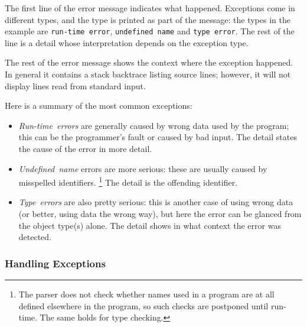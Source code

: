 The first line of the error message indicates what happened.
Exceptions come in different types, and the type is printed as part of
the message: the types in the example are
{\tt run-time error},
{\tt undefined name}
and
{\tt type error}.
The rest of the line is a detail whose interpretation depends on the
exception type.

The rest of the error message shows the context where the
exception happened.
In general it contains a stack backtrace listing source lines; however,
it will not display lines read from standard input.

Here is a summary of the most common exceptions:
\begin{itemize}
\item
{\em Run-time\ errors}
are generally caused by wrong data used by the program; this can be the
programmer's fault or caused by bad input.
The detail states the cause of the error in more detail.
\item
{\em Undefined\ name}
errors are more serious: these are usually caused by misspelled
identifiers.%
\footnote{
	The parser does not check whether names used in a program are at
	all defined elsewhere in the program, so such checks are
	postponed until run-time.  The same holds for type checking.
}
The detail is the offending identifier.
\item
{\em Type\ errors}
are also pretty serious: this is another case of using wrong data (or
better, using data the wrong way), but here the error can be glanced
from the object type(s) alone.
The detail shows in what context the error was detected.
\end{itemize}

\subsubsection{Handling Exceptions}

